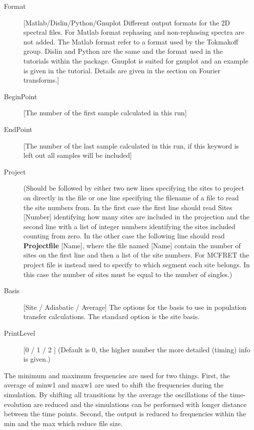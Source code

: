 \begin{description}
\item [Format] [Matlab/Dislin/Python/Gnuplot Different output formats for the 2D spectral files. For Matlab format rephasing and non-rephasing spectra are not added. The Matlab format refer to a format used by the Tokmakoff group. Dislin and Python are the same and the format used in the tutorials within the package. Gnuplot is suited for gnuplot and an example is given in the tutorial. Details are given in the section on Fourier transforms.] 
\item [BeginPoint] [The number of the first sample calculated in this run]
\item [EndPoint] [The number of the last sample calculated in this run, if this keyword is left out all samples will be included]
\item [Project] (Should be followed by either two new lines specifying the sites to project on directly in the file or one line specifying the filename of a file to read the site numbers from. In the first case the first line should read Sites [Number] identifying how many sites are included in the projection and the second line with a list of integer numbers identifying the sites included counting from zero. In the other case the following line should read \textbf{Projectfile} [Name], where the file named [Name] contain the number of sites on the first line and then a list of the site numbers. For MCFRET the project file is instead used to specify to which segment each site belongs. In this case the number of sites must be equal to the number of singles.)
\item[Basis] [Site / Adiabatic / Average] The options for the basis to use in population transfer calculations. The standard option is the site basis.
\item [PrintLevel] [0 / 1 / 2 ] (Default is 0, the higher number the more detailed (timing) info is given.)
\end{description}

The minimum and maximum frequencies are used for two things. First, the average of minw1 and maxw1 are used to shift the frequencies during the simulation. By shifting all transitions by the
average the oscillations of the time-evolution are reduced and the simulations can be performed with
longer distance between the time points. Second, the output is reduced to frequencies within the
min and the max which reduce file size.

